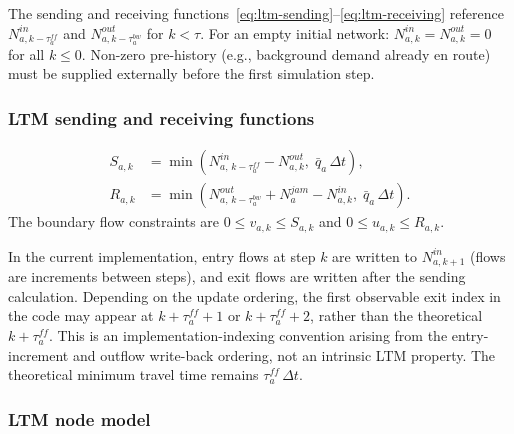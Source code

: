\begin{remark}
  The sending and receiving functions~\eqref{eq:ltm-sending}--\eqref{eq:ltm-receiving}
  reference $N^{in}_{a,k-\tau^{ff}_a}$ and $N^{out}_{a,k-\tau^{bw}_a}$
  for $k < \tau$.  For an empty initial network:
  $N^{in}_{a,k} = N^{out}_{a,k} = 0$ for all $k \le 0$.
  Non-zero pre-history (e.g., background demand already en route)
  must be supplied externally before the first simulation step.
\end{remark}

\subsubsection{LTM sending and receiving functions}

\begin{align}
  S_{a,k} &= \min\!\left(
    N^{in}_{a,\,k-\tau^{ff}_a} - N^{out}_{a,k},\;
    \bar{q}_a\,\Delta t
  \right),
  \label{eq:ltm-sending}\\
  R_{a,k} &= \min\!\left(
    N^{out}_{a,\,k-\tau^{bw}_a} + N^{jam}_a - N^{in}_{a,k},\;
    \bar{q}_a\,\Delta t
  \right).
  \label{eq:ltm-receiving}
\end{align}
The boundary flow constraints are
$0 \le v_{a,k} \le S_{a,k}$ and $0 \le u_{a,k} \le R_{a,k}$.

\begin{remark}
  In the current implementation, entry flows at step $k$ are written to
  $N^{in}_{a,k+1}$ (flows are increments between steps), and exit flows
  are written after the sending calculation.  Depending on the update
  ordering, the first observable exit index in the code may appear at
  $k + \tau^{ff}_a + 1$ or $k + \tau^{ff}_a + 2$, rather than the
  theoretical $k + \tau^{ff}_a$.  This is an implementation-indexing
  convention arising from the entry-increment and outflow write-back
  ordering, not an intrinsic LTM property.  The theoretical minimum
  travel time remains $\tau^{ff}_a\,\Delta t$.
\end{remark}

\subsubsection{LTM node model}

